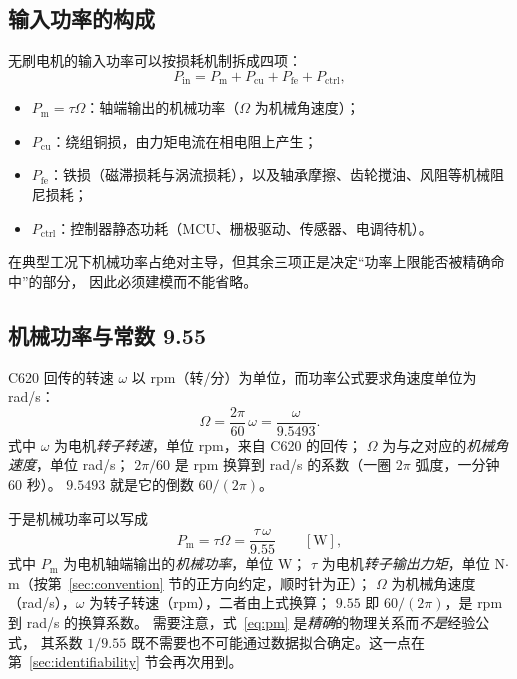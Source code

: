 \documentclass[cn,blue,11pt,device=normal]{elegantnote}
\newcommand{\Pin}{P_{\mathrm{in}}{}}
\newcommand{\Pmech}{P_{\mathrm{m}}{}}
\newcommand{\fref}[1]{式~\eqref{#1}}
\begin{document}
\subsection{输入功率的构成}

无刷电机的输入功率可以按损耗机制拆成四项：
\begin{equation}\label{eq:composition}
  \Pin = \Pmech + P_{\mathrm{cu}} + P_{\mathrm{fe}} + P_{\mathrm{ctrl}},
\end{equation}
\begin{itemize}
  \item $\Pmech = \tau\Omega$：轴端输出的机械功率（$\Omega$ 为机械角速度）；
  \item $P_{\mathrm{cu}}$：绕组铜损，由力矩电流在相电阻上产生；
  \item $P_{\mathrm{fe}}$：铁损（磁滞损耗与涡流损耗），以及轴承摩擦、齿轮搅油、风阻等机械阻尼损耗；
  \item $P_{\mathrm{ctrl}}$：控制器静态功耗（MCU、栅极驱动、传感器、电调待机）。
\end{itemize}
在典型工况下机械功率占绝对主导，但其余三项正是决定“功率上限能否被精确命中”的部分，
因此必须建模而不能省略。

\subsection{机械功率与常数 9.55}

C620 回传的转速 $\omega$ 以 rpm（转/分）为单位，而功率公式要求角速度单位为 rad/s：
\begin{equation}\label{eq:omega}
  \Omega = \frac{2\pi}{60}\,\omega = \frac{\omega}{9.5493}.
\end{equation}
式中 $\omega$ 为电机\emph{转子转速}，单位 rpm，来自 C620 的回传；
$\Omega$ 为与之对应的\emph{机械角速度}，单位 rad/s；
$2\pi/60$ 是 rpm 换算到 rad/s 的系数（一圈 $2\pi$ 弧度，一分钟 $60$ 秒）。
$9.5493$ 就是它的倒数 $60/(2\pi)$。

于是机械功率可以写成
\begin{equation}\label{eq:pm}
  \Pmech = \tau\Omega = \frac{\tau\,\omega}{9.55} \qquad [\mathrm{W}],
\end{equation}
式中 $\Pmech$ 为电机轴端输出的\emph{机械功率}，单位 W；
$\tau$ 为电机\emph{转子输出力矩}，单位 N$\cdot$m（按第~\ref{sec:convention} 节的正方向约定，顺时针为正）；
$\Omega$ 为机械角速度（rad/s），$\omega$ 为转子转速（rpm），二者由上式换算；
$9.55$ 即 $60/(2\pi)$，是 rpm 到 rad/s 的换算系数。
需要注意，\fref{eq:pm} 是\emph{精确}的物理关系而\emph{不是}经验公式，
其系数 $1/9.55$ 既不需要也不可能通过数据拟合确定。这一点在第~\ref{sec:identifiability} 节会再次用到。
\end{document}
